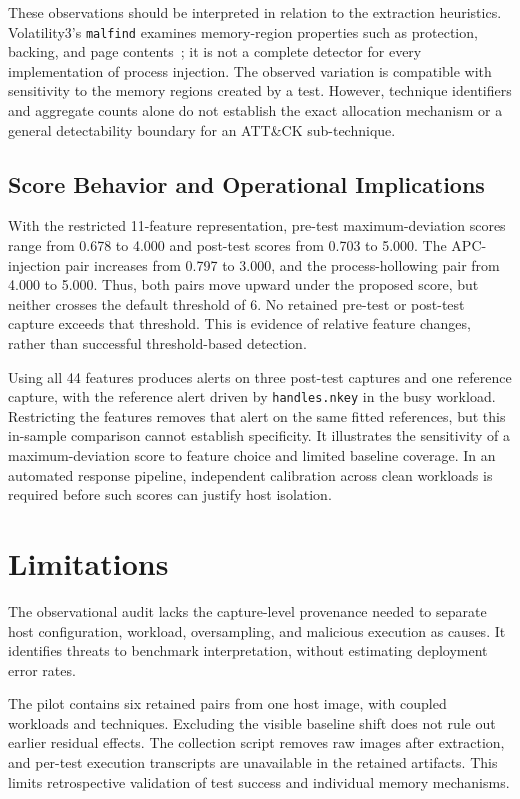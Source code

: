 \documentclass[conference]{IEEEtran}
\begin{document}
These observations should be interpreted in relation to the extraction
heuristics. Volatility3's \texttt{malfind} examines memory-region properties
such as protection, backing, and page contents~\cite{volatility3}; it is not a
complete detector for every implementation of process injection. The observed
variation is compatible with sensitivity to the memory regions created by a
test. However, technique identifiers and aggregate counts alone do not
establish the exact allocation mechanism or a general detectability boundary
for an ATT\&CK sub-technique.

\subsection{Score Behavior and Operational Implications}
With the restricted 11-feature representation, pre-test maximum-deviation
scores range from 0.678 to 4.000 and post-test scores from 0.703 to 5.000.
The APC-injection pair increases from 0.797 to 3.000, and the process-hollowing
pair from 4.000 to 5.000. Thus, both pairs move upward under the proposed
score, but neither crosses the default threshold of 6. No retained pre-test
or post-test capture exceeds that threshold. This is evidence of relative
feature changes, rather than successful threshold-based detection.

Using all 44 features produces alerts on three post-test captures and one
reference capture, with the reference alert driven by \texttt{handles.nkey}
in the busy workload. Restricting the features removes
that alert on the same fitted references, but this in-sample comparison cannot
establish specificity. It illustrates the sensitivity of a maximum-deviation
score to feature choice and limited baseline coverage. In an automated response
pipeline, independent calibration across clean workloads is required before
such scores can justify host isolation.

\section{Limitations}
\label{sec:limitations}

The observational audit lacks the capture-level provenance needed to separate
host configuration, workload, oversampling, and malicious execution as causes.
It identifies threats to benchmark interpretation, without estimating
deployment error rates.

The pilot contains six retained pairs from one host image, with coupled
workloads and techniques. Excluding the visible baseline shift does not rule
out earlier residual effects. The collection script removes raw images after
extraction, and per-test execution transcripts are unavailable in the retained
artifacts. This limits retrospective validation of test success and individual
memory mechanisms.
\end{document}
